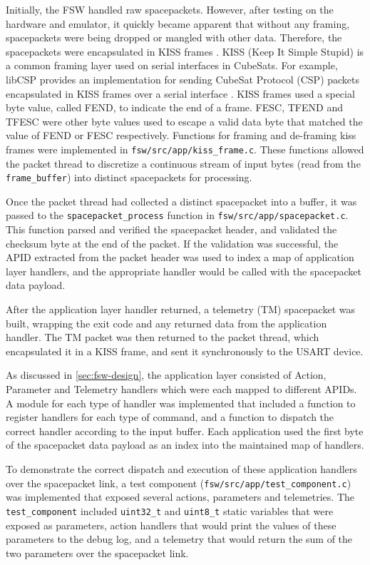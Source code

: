 \documentclass[../report.tex]{subfiles}
\begin{document}
Initially, the FSW handled raw spacepackets. However, after testing on the
hardware and emulator, it quickly became apparent that without any framing,
spacepackets were being dropped or mangled with other data. Therefore, the
spacepackets were encapsulated in KISS frames \citep{kiss}. KISS (Keep It
Simple Stupid) is a common framing layer used on serial interfaces in CubeSats.
For example, libCSP provides an implementation for sending CubeSat Protocol
(CSP) packets encapsulated in KISS frames over a serial interface
\citep{libCSP_kiss}. KISS frames used a special byte value, called FEND, to
indicate the end of a frame. FESC, TFEND and TFESC were other byte values used
to escape a valid data byte that matched the value of FEND or FESC
respectively. Functions for framing and de-framing kiss frames were implemented
in \lstinline|fsw/src/app/kiss_frame.c|. These functions allowed the
packet thread to discretize a continuous stream of input bytes (read from the
\lstinline|frame_buffer|) into distinct spacepackets for processing.

Once the packet thread had collected a distinct spacepacket into a
buffer, it was passed to the \lstinline|spacepacket_process| function in
\lstinline|fsw/src/app/spacepacket.c|. This function parsed and
verified the spacepacket header, and validated the checksum byte at the end of
the packet. If the validation was successful, the APID extracted from the
packet header was used to index a map of application layer handlers, and the
appropriate handler would be called with the spacepacket data payload.

After the application layer handler returned, a telemetry (TM) spacepacket was
built, wrapping the exit code and any returned data from the application
handler. The TM packet was then returned to the packet thread, which
encapsulated it in a KISS frame, and sent it synchronously to the USART device.

As discussed in \autoref{sec:fsw-design}, the application layer consisted of
Action, Parameter and Telemetry handlers which were each mapped to different
APIDs. A module for each type of handler was implemented that included a
function to register handlers for each type of command, and a function to
dispatch the correct handler according to the input buffer. Each application
used the first byte of the spacepacket data payload as an index into the
maintained map of handlers.

To demonstrate the correct dispatch and execution of these application handlers
over the spacepacket link, a test component
(\lstinline|fsw/src/app/test_component.c|) was implemented that exposed several
actions, parameters and telemetries. The \lstinline|test_component| included
\lstinline|uint32_t| and \lstinline|uint8_t| static variables that were exposed
as parameters, action handlers that would print the values of these parameters
to the debug log, and a telemetry that would return the sum of the two
parameters over the spacepacket link.
\end{document}

